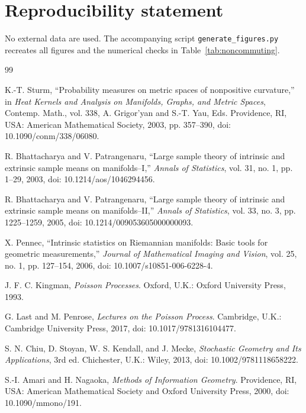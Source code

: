 \documentclass[11pt,a4paper]{article}
\theoremstyle{remark}
\begin{document}
\section*{Reproducibility statement}
No external data are used.  The accompanying script \texttt{generate\_figures.py} recreates all figures and the numerical checks in Table~\ref{tab:noncommuting}.


\begin{thebibliography}{99}

K.-T. Sturm, ``Probability measures on metric spaces of nonpositive curvature,'' in \emph{Heat Kernels and Analysis on Manifolds, Graphs, and Metric Spaces}, Contemp. Math., vol. 338, A. Grigor'yan and S.-T. Yau, Eds. Providence, RI, USA: American Mathematical Society, 2003, pp. 357--390, doi: 10.1090/conm/338/06080.

R. Bhattacharya and V. Patrangenaru, ``Large sample theory of intrinsic and extrinsic sample means on manifolds--I,'' \emph{Annals of Statistics}, vol. 31, no. 1, pp. 1--29, 2003, doi: 10.1214/aos/1046294456.

R. Bhattacharya and V. Patrangenaru, ``Large sample theory of intrinsic and extrinsic sample means on manifolds--II,'' \emph{Annals of Statistics}, vol. 33, no. 3, pp. 1225--1259, 2005, doi: 10.1214/009053605000000093.

X. Pennec, ``Intrinsic statistics on Riemannian manifolds: Basic tools for geometric measurements,'' \emph{Journal of Mathematical Imaging and Vision}, vol. 25, no. 1, pp. 127--154, 2006, doi: 10.1007/s10851-006-6228-4.

J. F. C. Kingman, \emph{Poisson Processes}. Oxford, U.K.: Oxford University Press, 1993.

G. Last and M. Penrose, \emph{Lectures on the Poisson Process}. Cambridge, U.K.: Cambridge University Press, 2017, doi: 10.1017/9781316104477.

S. N. Chiu, D. Stoyan, W. S. Kendall, and J. Mecke, \emph{Stochastic Geometry and Its Applications}, 3rd ed. Chichester, U.K.: Wiley, 2013, doi: 10.1002/9781118658222.

S.-I. Amari and H. Nagaoka, \emph{Methods of Information Geometry}. Providence, RI, USA: American Mathematical Society and Oxford University Press, 2000, doi: 10.1090/mmono/191.


\end{thebibliography}
\end{document}
